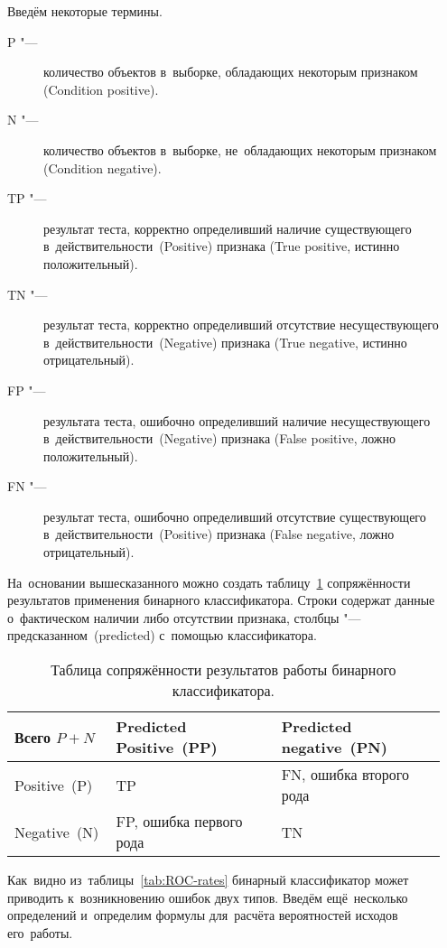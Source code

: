 \documentclass[]{scrreprt}
\begin{document}
Введём некоторые термины.
\begin{description}
	\item[P "---] количество объектов в~выборке, обладающих некоторым признаком (\foreignlanguage{english}{Condition positive}).
	\item[N "---] количество объектов в~выборке, не~обладающих некоторым признаком (\foreignlanguage{english}{Condition negative}).
	\item[TP "---] результат теста, корректно определивший наличие существующего в~действительности~(\foreignlanguage{english}{Positive}) признака (\foreignlanguage{english}{True positive}, истинно положительный).
	\item[TN "---] результат теста, корректно определивший отсутствие несуществующего в~действительности~(\foreignlanguage{english}{Negative}) признака (\foreignlanguage{english}{True negative}, истинно отрицательный).
	\item[FP "---] результата теста, ошибочно определивший наличие несуществующего в~действительности~(\foreignlanguage{english}{Negative}) признака (\foreignlanguage{english}{False positive}, ложно положительный).
	\item[FN "---] результат теста, ошибочно определивший отсутствие существующего в~действительности~(\foreignlanguage{english}{Positive}) признака (\foreignlanguage{english}{False negative}, ложно отрицательный).
\end{description}
На~основании вышесказанного можно создать таблицу~\ref{tab:ROC-contingency-table} сопряжённости результатов применения бинарного классификатора. Строки содержат данные о~фактическом наличии либо отсутствии признака, столбцы "--- предсказанном~(\foreignlanguage{english}{predicted}) с~помощью классификатора.
%
\begin{table}[ht]
	\caption{Таблица сопряжённости результатов работы бинарного классификатора.}  \label{tab:ROC-contingency-table}
	\centering
	\begin{tabularx}{\textwidth}{p{0.2\linewidth} p{0.375\linewidth} p{0.375\linewidth}} 
		\hline
		Всего $P+N$&Predicted Positive~(PP)&Predicted negative~(PN)\\
		\hline
		Positive~(P)&TP&FN, ошибка второго рода~\cite{Wiki:type-1-2-errors}\\
		\hline
		Negative~(N)&FP, ошибка первого рода~\cite{Wiki:type-1-2-errors}&TN\\
		\hline
	\end{tabularx}
\end{table}
%
Как~видно из~таблицы~\ref{tab:ROC-rates} бинарный классификатор может приводить к~возникновению ошибок двух типов. Введём ещё~несколько определений и~определим формулы для~расчёта вероятностей исходов его~работы.
\end{document}
